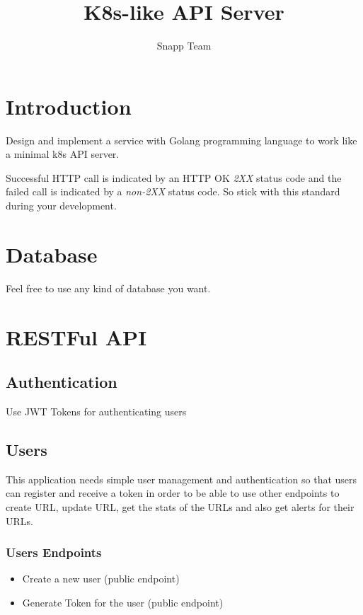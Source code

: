 \documentclass{article}
\begin{document}
\title{K8s-like API Server}
\author{Snapp Team}

\maketitle
\tableofcontents

\section{Introduction}
Design and implement a service with Golang programming language to work like a minimal k8s API server.

Successful HTTP call is indicated by an HTTP OK \textit{2XX} status code and the failed call is indicated by a \textit{non-2XX} status code.
So stick with this standard during your development.

\section{Database}

Feel free to use any kind of database you want.

\section{RESTFul API}
\subsection{Authentication}
Use JWT Tokens for authenticating users

\subsection{Users}
This application needs simple user management and authentication so that users can register and receive a token in order to be able to use other endpoints to create URL, update URL, get the stats of the URLs and also get alerts for their URLs.

\subsubsection{Users Endpoints}
\begin{itemize}
  \item Create a new user (public endpoint)
  \item Generate Token for the user (public endpoint)
\end{itemize}
\end{document}
